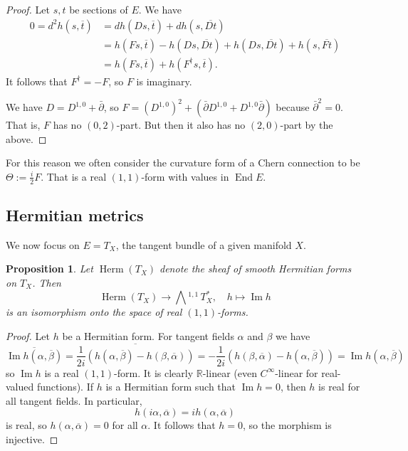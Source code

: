 \documentclass[10pt,a4paper]{article}
\newtheorem{prop}[theo]{Proposition}
\newtheorem*{proof}{Proof}
\newcommand{\kk}[1]{\mathbb{#1}}
\def\ov#1{\overline{#1}}
\DeclareMathOperator{\im}{Im}
\DeclareMathOperator{\End}{End}
\newcommand{\ext}[1]{\bigwedge{}^{\!\!#1}\,}
\begin{document}
\begin{proof}
Let $s, t$ be sections of $E$. We have
\begin{align*}
0
= d^2 h(s, \ov t)
&= d h(Ds, \ov t) + d h(s, \ov{Dt})
\\
&= h(F s, \ov t) - h(Ds, \ov{Dt}) + h(Ds, \ov{Dt}) + h(s, \ov{F t})
\\
&=
h(Fs,\ov t) + h(F^{\dagger}s, \ov{t}).
\end{align*}
It follows that $F^\dagger = -F$, so $F$ is imaginary.

We have $D = D^{1,0} + \bar\partial$, so $F = (D^{1,0})^2 + (\bar\partial D^{1,0} + D^{1,0}\bar\partial)$ because $\bar\partial^2 = 0$. That is, $F$ has no $(0,2)$-part. But then it also has no $(2,0)$-part by the above.
\end{proof}

For this reason we often consider the curvature form of a Chern connection to be $\Theta := \frac i2 F$. That is a real $(1,1)$-form with values in $\End E$.



\subsection{Hermitian metrics}

We now focus on $E = T_X$, the tangent bundle of a given manifold $X$.


\begin{prop}
Let $\operatorname{Herm}(T_X)$ denote the sheaf of smooth Hermitian forms on $T_X$. Then
$$
\operatorname{Herm}(T_X) \to \ext{1,1} T_X^*,
\quad
h \mapsto \im h
$$
is an isomorphism onto the space of real $(1,1)$-forms.
\end{prop}

\begin{proof}
Let $h$ be a Hermitian form. For tangent fields $\alpha$ and $\beta$ we have
$$
\overline{\im h(\alpha,\ov\beta)}
= \overline{\frac{1}{2i}(h(\alpha,\ov\beta) - h(\beta,\ov\alpha))}
= -\frac{1}{2i}(h(\beta,\ov\alpha) - h(\alpha,\ov\beta))
= \im h(\alpha, \ov\beta)
$$
so $\im h$ is a real $(1,1)$-form. It is clearly $\kk R$-linear (even $C^\infty$-linear for real-valued functions). If $h$ is a Hermitian form such that $\im h = 0$, then $h$ is real for all tangent fields. In particular,
$$
h(i\alpha, \ov\alpha) = i h(\alpha,\ov\alpha)
$$
is real, so $h(\alpha,\ov\alpha) = 0$ for all $\alpha$. It follows that $h = 0$, so the morphism is injective.
\end{proof}
\end{document}
